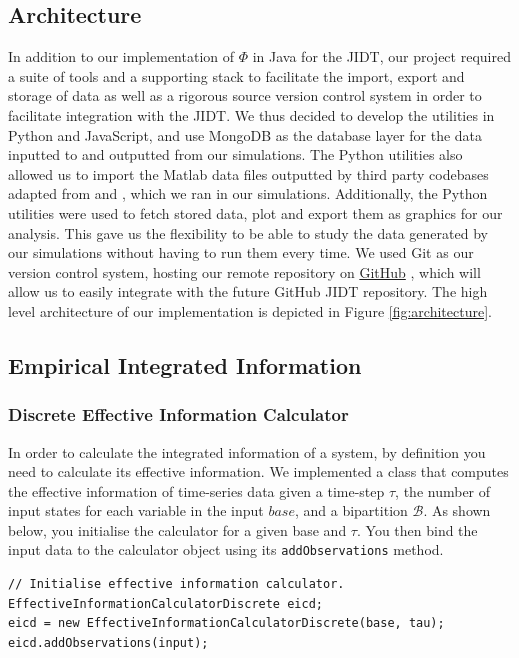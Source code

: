 \documentclass[a4paper,11pt]{article}
\begin{document}
\subsection{Architecture}

In addition to our implementation of $\Phi$ in Java for the JIDT, our project required a suite of tools and a supporting stack to facilitate the import, export and storage of data as well as a rigorous source version control system in order to facilitate integration with the JIDT. We thus decided to develop the utilities in Python and JavaScript, and use MongoDB \cite{MongoDB} as the database layer for the data inputted to and outputted from our simulations. The Python utilities also allowed us to import the Matlab data files outputted by third party codebases adapted from \cite{Shanahan2010} and \cite{Bhowmik2013}, which we ran in our simulations. Additionally, the Python utilities were used to fetch stored data, plot and export them as graphics for our analysis. This gave us the flexibility to be able to study the data generated by our simulations without having to run them every time. We used Git as our version control system, hosting our remote repository on \href{http://github.com}{GitHub} \cite{GitHub}, which will allow us to easily integrate with the future GitHub JIDT repository. The high level architecture of our implementation is depicted in Figure \ref{fig:architecture}.

\subsection{Empirical Integrated Information}
\label{sec:impl:phi-e}

\subsubsection{Discrete Effective Information Calculator}
\label{sec:impl:ei}

In order to calculate the integrated information of a system, by definition you need to calculate its effective information. We implemented a class that computes the effective information of time-series data given a time-step $\tau$, the number of input states for each variable in the input $base$, and a bipartition $\mathcal{B}$. As shown below, you initialise the calculator for a given base and $\tau$. You then bind the input data to the calculator object using its \texttt{addObservations} method.

\begin{verbatim}
// Initialise effective information calculator.
EffectiveInformationCalculatorDiscrete eicd;
eicd = new EffectiveInformationCalculatorDiscrete(base, tau);
eicd.addObservations(input);
\end{verbatim}
\end{document}
